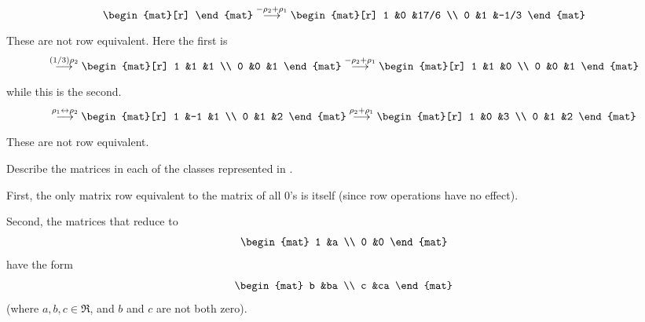 \begin{exercises}
\begin{answer}
\begin{exparts}
\begin{equation*}
\begin{mat}[r]
            \end{mat}
            \grstep{-\rho_2+\rho_1}
            \begin{mat}[r]
              1  &0  &17/6 \\
              0  &1  &-1/3
            \end{mat}
          \end{equation*}
          These are not row equivalent.
        \partsitem Here the first is
          \begin{equation*}
            \grstep{(1/3)\rho_2}
            \begin{mat}[r]
              1  &1  &1  \\
              0  &0  &1
            \end{mat}
            \grstep{-\rho_2+\rho_1}
            \begin{mat}[r]
              1  &1  &0  \\
              0  &0  &1
            \end{mat}
          \end{equation*}
          while this is the second.
          \begin{equation*}
            \grstep{\rho_1\leftrightarrow\rho_2}
            \begin{mat}[r]
              1  &-1 &1  \\
              0  &1  &2
            \end{mat}
            \grstep{\rho_2+\rho_1}
            \begin{mat}[r]
              1  &0  &3  \\
              0  &1  &2
            \end{mat}
          \end{equation*}
          These are not row equivalent.
       \end{exparts}  
     \end{answer}
  \item 
     Describe the matrices in each of the classes represented in
     .
     \begin{answer}
       First, the only matrix row equivalent to the matrix of all
       \( 0 \)'s is itself (since row operations have no effect).

       Second, the matrices that reduce to 
       \begin{equation*}
         \begin{mat}
           1  &a  \\
           0  &0
         \end{mat}
       \end{equation*}
       have the form
       \begin{equation*}
         \begin{mat}
           b  &ba \\
           c  &ca
         \end{mat}
       \end{equation*}
       (where \( a,b,c\in\Re \), and \(b\) and \(c\) are not both zero).  


\end{answer}
\end{exercises}

